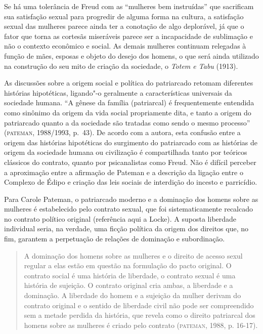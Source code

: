 Se há uma tolerância de Freud com as ``mulheres bem instruídas'' que
sacrificam sua satisfação sexual para progredir de alguma forma na
cultura, a satisfação sexual das mulheres parece ainda ter a conotação
de algo deplorável, já que o fator que torna as cortesãs miseráveis
parece ser a incapacidade de sublimação e não o contexto econômico e
social. As demais mulheres continuam relegadas à função de mães, esposas
e objeto do desejo dos homens, o que será ainda utilizado na construção
do seu mito de criação da sociedade, o \emph{Totem e Tabu} (1913).

As discussões sobre a origem social e política do patriarcado retomam
diferentes histórias hipotéticas, ligando"-o geralmente a características
universais da sociedade humana. ``A gênese da família (patriarcal) é
frequentemente entendida como sinônimo da origem da vida social
propriamente dita, e tanto a origem do patriarcado quanto a da sociedade
são tratadas como sendo o mesmo processo'' (\textsc{pateman}, 1988/1993,
p.~43). De acordo com a autora, esta confusão entre a origem das
histórias hipotéticas do surgimento do patriarcado com as histórias de
origem da sociedade humana ou civilização é compartilhada tanto por
teóricos clássicos do contrato, quanto por psicanalistas como Freud. Não
é difícil perceber a aproximação entre a afirmação de Pateman e a
descrição da ligação entre o Complexo de Édipo e criação das leis
sociais de interdição do incesto e parricídio.

Para Carole Pateman, o patriarcado moderno e a dominação dos
homens sobre as mulheres é estabelecido pelo contrato sexual, que foi
sistematicamente recalcado no contrato político original (referência
aqui a Locke). A suposta liberdade individual seria, na verdade, uma
ficção política da origem dos direitos que, no fim, garantem a
perpetuação de relações de dominação e subordinação.

\begin{quote}
A dominação dos homens sobre as mulheres e o direito de acesso sexul
regular a elas estão em questão na formulação do pacto original. O
contrato social é uma história de liberdade, o contrato sexual é uma
história de sujeição. O contrato original cria ambas, a liberdade e a
dominação. A liberdade do homem e a sujeição da mulher derivam do
contrato original e o sentido de liberdade civil não pode ser
compreendido sem a metade perdida da história, que revela como o direito
patriarcal dos homens sobre as mulheres é criado pelo contrato (\textsc{pateman}, 1988, p. 16-17).
\end{quote}

